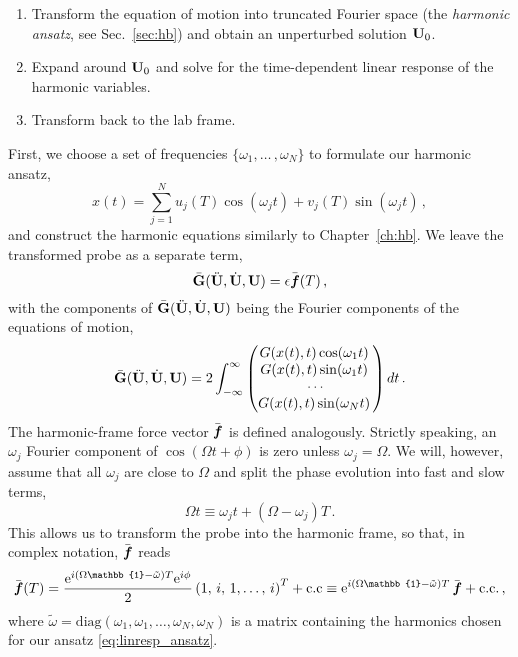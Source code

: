 \begin{enumerate}
	\item Transform the equation of motion into truncated Fourier space (the \textit{harmonic ansatz}, see Sec.~\ref{sec:hb}) and obtain an unperturbed solution $\vb{U}_0$. 
	\item Expand around $\vb{U}_0$ and solve for the time-dependent linear response of the harmonic variables. 
	\item Transform back to the lab frame. 
\end{enumerate}
First, we choose a set of frequencies $\{ \omega_1,\ldots \,, \omega_N\}$ to formulate our harmonic ansatz,
%
\begin{equation} \label{eq:linresp_ansatz}
	x(t) = \sum_{j=1}^{N} u_j(T) \cos(\omega_j t) + v_j(T) \sin(\omega_j t)\,,
\end{equation}
%
and construct the harmonic equations similarly to Chapter~\ref{ch:hb}. We leave the transformed probe as a separate term,
\begin{equation} \label{eq:linresp_harmeq}
\bar{\vb{G}}(\ddot{\vb{U}}, \dot{\vb{U}},\vb{U}) = \epsilon \bar{\boldsymbol{f}}(T)\,,
\end{equation}
with the components of $\bar{\vb{G}}(\ddot{\vb{U}}, \dot{\vb{U}},\vb{U})$ being the Fourier components of the equations of motion,
\begin{equation}
\bar{\vb{G}}(\ddot{\vb{U}}, \dot{\vb{U}},\vb{U}) = 2 \int_{-\infty}^{\infty} \mqty( G(x(t),t) \cos(\omega_{1} t) \,
\\  G(x(t),t) \sin(\omega_{1} t) \,
\\ \cdots 
\\ G(x(t),t) \sin(\omega_{N} t) \,) \, dt \,.
\end{equation}
The harmonic-frame force vector $\bar{\boldsymbol{f}}$ is defined analogously. Strictly speaking, an $\omega_j$ Fourier component of $\cos(\Omega t + \phi)$ is zero unless $\omega_j = \Omega$. We will, however, assume that all $\omega_j$ are close to $\Omega$ and split the phase evolution into fast and slow terms,
\begin{equation}
\Omega t \equiv \omega_j t + (\Omega - \omega_j) T \,.
\end{equation}
This allows us to transform the probe into the harmonic frame, so that, in complex notation, $\bar{\boldsymbol{f}}$ reads
\begin{equation}
\bbar{f}(T) = \frac{\e^{i(\Omega\mathbb{1} - \tilde{\omega})T} \e^{i \phi}}{2} \left(1,\,i,\,1, \ldots ,\,i \right)^T + \text{c.c} \equiv \e^{i(\Omega \mathbb{1} - \tilde{\omega})T}\, \bbar{f} + \text{c.c.}\,,
\end{equation}
where $\tilde{\omega} =  \text{diag}(\omega_1, \omega_1, \ldots, \omega_N, \omega_N)$ is a matrix containing the harmonics chosen for our ansatz \eqref{eq:linresp_ansatz}.


